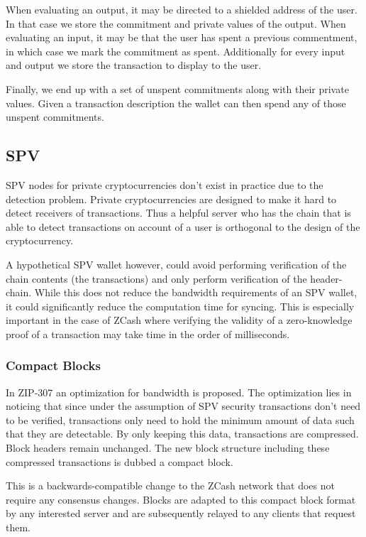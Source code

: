 \documentclass[sigconf]{acmart}
\begin{document}
When evaluating an output, it may be directed to a shielded address of the user. In that case we store the commitment and private values of the output. When evaluating an input, it may be that the user has spent a previous commentment, in which case we mark the commitment as spent. Additionally for every input and output we store the transaction to display to the user.

Finally, we end up with a set of unspent commitments along with their private values. Given a transaction description the wallet can then spend any of those unspent commitments.

\subsection{SPV}
SPV nodes for private cryptocurrencies don't exist in practice due to the detection problem. Private cryptocurrencies are designed to make it hard to detect receivers of transactions. Thus a helpful server who has the chain that is able to detect transactions on account of a user is orthogonal to the design of the cryptocurrency.

A hypothetical SPV wallet however, could avoid performing verification of the chain contents (the transactions) and only perform verification of the header-chain. While this does not reduce the bandwidth requirements of an SPV wallet, it could significantly reduce the computation time for syncing. This is especially important in the case of ZCash where verifying the validity of a zero-knowledge proof of a transaction may take time in the order of milliseconds.

\subsubsection{Compact Blocks}
In ZIP-307 an optimization for bandwidth is proposed. The optimization lies in noticing that since under the assumption of SPV security transactions don't need to be verified, transactions only need to hold the minimum amount of data such that they are detectable. By only keeping this data, transactions are compressed. Block headers remain unchanged. The new block structure including these compressed transactions is dubbed a compact block.

This is a backwards-compatible change to the ZCash network that does not require any consensus changes. Blocks are adapted to this compact block format by any interested server and are subsequently relayed to any clients that request them.
\end{document}
